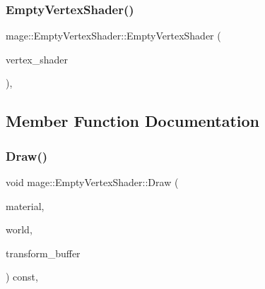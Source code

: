 \hypertarget{classmage_1_1_empty_vertex_shader_abf41f0b60923651b570abd3d6753f8a0}{}\label{classmage_1_1_empty_vertex_shader_abf41f0b60923651b570abd3d6753f8a0} 
\subsubsection{\texorpdfstring{Empty\+Vertex\+Shader()}{EmptyVertexShader()}\hspace{0.1cm}{\footnotesize\ttfamily [3/3]}}
{\footnotesize\ttfamily mage\+::\+Empty\+Vertex\+Shader\+::\+Empty\+Vertex\+Shader (\begin{DoxyParamCaption}\item[{\hyperlink{classmage_1_1_empty_vertex_shader}{Empty\+Vertex\+Shader} \&\&}]{vertex\+\_\+shader }\end{DoxyParamCaption})\hspace{0.3cm}{\ttfamily [private]}, {\ttfamily [delete]}}



\subsection{Member Function Documentation}
\hypertarget{classmage_1_1_empty_vertex_shader_aaecd66ff2aa90221accbde8e5bf1f239}{}\label{classmage_1_1_empty_vertex_shader_aaecd66ff2aa90221accbde8e5bf1f239} 
\subsubsection{\texorpdfstring{Draw()}{Draw()}}
{\footnotesize\ttfamily void mage\+::\+Empty\+Vertex\+Shader\+::\+Draw (\begin{DoxyParamCaption}\item[{const \hyperlink{structmage_1_1_material}{Material} \&}]{material,  }\item[{const \hyperlink{classmage_1_1_world}{World} \&}]{world,  }\item[{const \hyperlink{structmage_1_1_transform_buffer}{Transform\+Buffer} \&}]{transform\+\_\+buffer }\end{DoxyParamCaption}) const\hspace{0.3cm}{\ttfamily [override]}, {\ttfamily [virtual]}}



